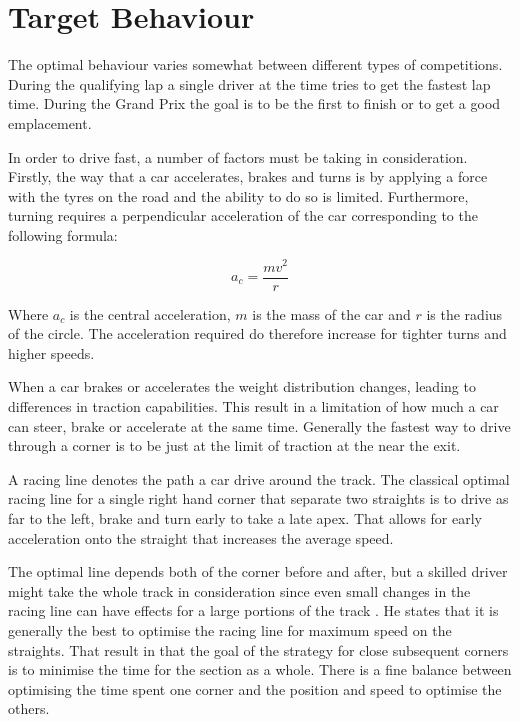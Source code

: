 \section{Target Behaviour}
The optimal behaviour varies somewhat between different types of competitions. During the qualifying lap a single driver at the time tries to get the fastest lap time. During the Grand Prix the goal is to be the first to finish or to get a good emplacement. 

In order to drive fast, a number of factors must be taking in consideration. Firstly, the way that a car accelerates, brakes and turns is by applying a force with the tyres on the road and the ability to do so is limited\cite{beckman_traction_budget}. Furthermore, turning requires a perpendicular acceleration of the car corresponding to the following formula:

\[
a_c = \frac{mv^2}{r}
\]

Where $a_c$ is the central acceleration, $m$ is the mass of the car and $r$ is the radius of the circle\cite{beckman_circular_motion}. The acceleration required do therefore increase for tighter turns and higher speeds.

When a car brakes or accelerates the weight distribution changes, leading to differences in traction capabilities. This result in a limitation of how much a car can steer, brake or accelerate at the same time\cite{beckman_weight_transfer}. Generally the fastest way to drive through a corner is to be just at the limit of traction at the near the exit\cite{beckman_racing_line_intro}.  

A racing line denotes the path a car drive around the track. The classical optimal racing line for a single right hand corner that separate two straights is to drive as far to the left, brake and turn early to take a late apex\cite{beckman_racing_line_intro}. That allows for early acceleration onto the straight that increases the average speed.

The optimal line depends both of the corner before and after, but a skilled driver might take the whole track in consideration since even small changes in the racing line can have effects for a large portions of the track \cite{beckman_racing_line_intro}. He states that it is generally the best to optimise the racing line for maximum speed on the straights. That result in that the goal of the strategy for close subsequent corners is to minimise the time for the section as a whole. There is a fine balance between optimising the time spent one corner and the position and speed to optimise the others.

